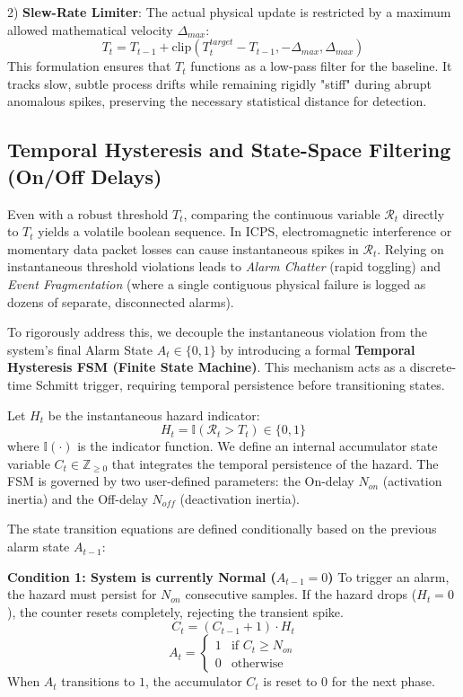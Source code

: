 \documentclass[journal]{IEEEtran}
\begin{document}
	2) \textbf{Slew-Rate Limiter}: The actual physical update is restricted by a maximum allowed mathematical velocity $\Delta_{max}$:
	\begin{equation}
		T_t = T_{t-1} + \text{clip}(T^{target}_t - T_{t-1}, -\Delta_{max}, \Delta_{max})
	\end{equation}
	This formulation ensures that $T_t$ functions as a low-pass filter for the baseline. It tracks slow, subtle process drifts while remaining rigidly "stiff" during abrupt anomalous spikes, preserving the necessary statistical distance for detection.
	
	\subsection{Temporal Hysteresis and State-Space Filtering (On/Off Delays)}
	Even with a robust threshold $T_t$, comparing the continuous variable $\mathcal{R}_t$ directly to $T_t$ yields a volatile boolean sequence. In ICPS, electromagnetic interference or momentary data packet losses can cause instantaneous spikes in $\mathcal{R}_t$. Relying on instantaneous threshold violations leads to \textit{Alarm Chatter} (rapid toggling) and \textit{Event Fragmentation} (where a single contiguous physical failure is logged as dozens of separate, disconnected alarms).
	
	To rigorously address this, we decouple the instantaneous violation from the system's final Alarm State $A_t \in \{0, 1\}$ by introducing a formal \textbf{Temporal Hysteresis FSM (Finite State Machine)}. This mechanism acts as a discrete-time Schmitt trigger, requiring temporal persistence before transitioning states.
	
	Let $H_t$ be the instantaneous hazard indicator:
	\begin{equation}
		H_t = \mathbb{I}(\mathcal{R}_t > T_t) \in \{0, 1\}
	\end{equation}
	where $\mathbb{I}(\cdot)$ is the indicator function. We define an internal accumulator state variable $C_t \in \mathbb{Z}_{\ge 0}$ that integrates the temporal persistence of the hazard. The FSM is governed by two user-defined parameters: the On-delay $N_{on}$ (activation inertia) and the Off-delay $N_{off}$ (deactivation inertia).
	
	The state transition equations are defined conditionally based on the previous alarm state $A_{t-1}$:
	
	\textbf{Condition 1: System is currently Normal ($A_{t-1} = 0$)}
	To trigger an alarm, the hazard must persist for $N_{on}$ consecutive samples. If the hazard drops ($H_t = 0$), the counter resets completely, rejecting the transient spike.
	\begin{equation}
		C_t = (C_{t-1} + 1) \cdot H_t
	\end{equation}
	\begin{equation}
		A_t = 
		\begin{cases}
			1 & \text{if } C_t \ge N_{on} \\
			0 & \text{otherwise}
		\end{cases}
	\end{equation}
	When $A_t$ transitions to $1$, the accumulator $C_t$ is reset to $0$ for the next phase.
	
\end{document}
